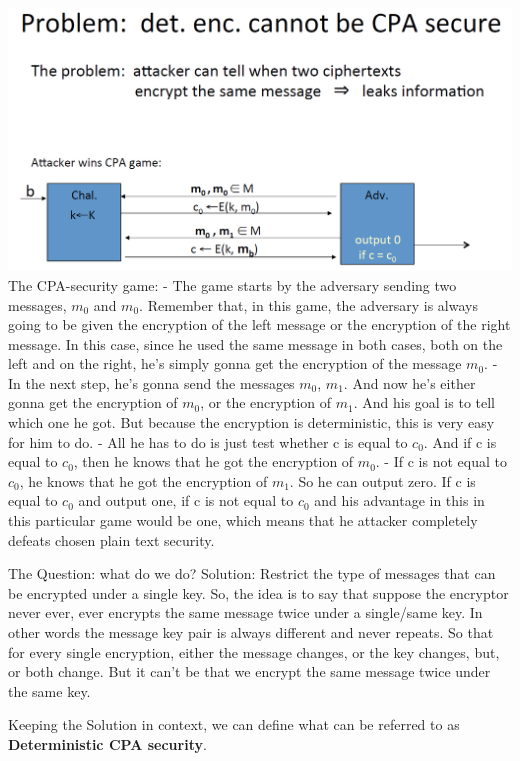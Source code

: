 \documentclass[11pt]{article}
\makeatletter
\def\maxwidth{\ifdim\Gin@nat@width>\linewidth\linewidth
    \else\Gin@nat@width\fi}
\let\Oldincludegraphics\includegraphics
\renewcommand{\includegraphics}[1]{\Oldincludegraphics[width=.8\maxwidth]{#1}}
\makeatother
\begin{document}
\includegraphics{./Images/DetEnc-Prob.png} The CPA-security game: - The
game starts by the adversary sending two messages, \(m_{0}\) and
\(m_{0}\). Remember that, in this game, the adversary is always going to
be given the encryption of the left message or the encryption of the
right message. In this case, since he used the same message in both
cases, both on the left and on the right, he's simply gonna get the
encryption of the message \(m_{0}\). - In the next step, he's gonna send
the messages \(m_{0}\), \(m_{1}\). And now he's either gonna get the
encryption of \(m_{0}\), or the encryption of \(m_{1}\). And his goal is
to tell which one he got. But because the encryption is deterministic,
this is very easy for him to do. - All he has to do is just test whether
c is equal to \(c_{0}\). And if c is equal to \(c_{0}\), then he knows
that he got the encryption of \(m_{0}\). - If c is not equal to
\(c_{0}\), he knows that he got the encryption of \(m_{1}\). So he can
output zero. If c is equal to \(c_{0}\) and output one, if c is not
equal to \(c_{0}\) and his advantage in this in this particular game
would be one, which means that he attacker completely defeats chosen
plain text security.

The Question: what do we do? Solution: Restrict the type of messages
that can be encrypted under a single key. So, the idea is to say that
suppose the encryptor never ever, ever encrypts the same message twice
under a single/same key. In other words the message key pair is always
different and never repeats. So that for every single encryption, either
the message changes, or the key changes, but, or both change. But it
can't be that we encrypt the same message twice under the same key.

Keeping the Solution in context, we can define what can be referred to
as \textbf{Deterministic CPA security}.
\end{document}
